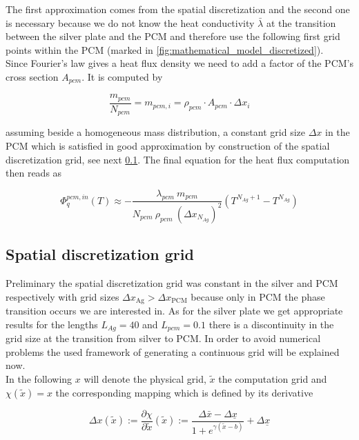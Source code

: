 \documentclass{scrartcl}[12pt, halfparskip]
\numberwithin{equation}{section}
\numberwithin{figure}{section}
\numberwithin{table}{section}
\begin{document}
The first approximation comes from the spatial discretization and the second one is necessary because we do not know the heat conductivity $\bar{\lambda}$ at the transition between the silver plate and the PCM and therefore use the following first grid points within the PCM (marked in \cref{fig:mathematical_model_discretized}). \\
Since Fourier's law gives a heat flux density we need to add a factor of the PCM's cross section $A_{pcm}$. It is computed by

\begin{equation}
	\frac{m_{pcm}}{N_{pcm}} = m_{pcm,i} = \rho_{pcm} \cdot A_{pcm} \cdot \Delta x_i 
\end{equation}



assuming beside a homogeneous mass distribution, a constant grid size $\Delta x$ in the PCM which is satisfied in good approximation by construction of the spatial discretization grid, see next \cref{sec:spatial_discretization_grid}. The final equation for the heat flux computation then reads as

\begin{equation}
	\varPhi_{q}^{pcm,in}(T) \approx - \frac{\lambda_{pcm} \ m_{pcm}}{N_{pcm} \ \rho_{pcm} \ (\Delta x_{N_{Ag}})^2} \left( T^{N_{Ag}+1} - T^{N_{Ag}} \right)
	\label{eq:heat_flux_computation_final}
\end{equation}



\subsection{Spatial discretization grid}
\label{sec:spatial_discretization_grid}
Preliminary the spatial discretization grid was constant in the silver and PCM respectively with grid sizes $\Delta x_{\text{Ag}} > \Delta x_{\text{PCM}}$ because only in PCM the phase transition occurs we are interested in. As for the silver plate we get appropriate results for the lengths $L_{Ag}=40$ and $L_{pcm}=0.1$ there is a discontinuity in the grid size at the transition from silver to PCM. In order to avoid numerical problems the used framework of generating a continuous grid will be explained now. \\
In the following $x$ will denote the physical grid, $\tilde{x}$ the computation grid and $\chi(\tilde{x}) = x$ the corresponding mapping which is defined by its derivative

\begin{equation}
	\Delta x(\tilde{x}) := \frac{\partial \chi}{\partial \tilde{x}}(\tilde{x}) := \frac{\Delta \bar{x} - \Delta \underline{x}}{1 + e^{\gamma(\tilde{x} - b)}} + \Delta \underline{x}
	\label{eq:gridsize_definition}
\end{equation}
\end{document}
